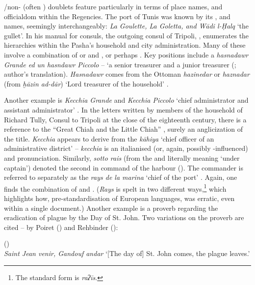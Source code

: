 \documentclass[output=paper]{langsci/langscibook}
\begin{document}
	/non- (often ) doublets feature particularly in terms of place names, and officialdom within the Regencies. The port of Tunis was known by its ,  and  names, seemingly interchangeably: \textit{La Goulette, La Goletta, and Wādi l-Ḥalq} ‘the gullet’. In his manual for  consuls, the outgoing  consul of Tripoli, , enumerates the hierarchies within the Pasha’s household and city administration. Many of these involve a combination of  or  and , or perhaps . Key positions include a \textit{hasnadawr Grande ed un hasndawr Piccolo} – ‘a senior treasurer and a junior treasurer (\citealt[97]{Pennell1982}; author's translation).  \textit{Hasnadawr} comes from the Ottoman  \textit{hazinedar} or \textit{haznadar} (from  \textit{ḫāzin ad-dār}) ‘Lord treasurer of the household’ \citep{Gilson1987}.
	
	Another example is \textit{Kecchia Grande} and \textit{Kecchia Piccolo} ‘chief administrator and assistant administrator’ \citep[104]{Pennell1982}. In the letters written by members of the household of Richard Tully,  Consul to Tripoli at the close of the eighteenth century, there is a reference to the ``Great Chiah and the Little Chiah'' \citep[70]{Tully1819}, surely an anglicization of the title. \textit{Kecchia} appears to derive from the   \textit{kāhiya} ‘chief officer of an administrative district’ – \textit{kecchia} is an italianised (or, again, possibly -influenced)  and pronunciation. Similarly, \textit{sotto rais} (from the  and  literally meaning ‘under captain’) denoted the second in command of the harbour (\citealt[97, 100]{Pennell1982}). The commander is referred to separately as the \textit{rays de la marina} ‘chief of the port’ \citep[92]{Pennell1982}. Again, one finds the combination of  and . (\textit{Rays} is spelt in two different ways,\footnote{The standard  form is \textit{raʔīs}.} which highlights how, pre-standardisation of European languages,  was erratic, even within a single document.) Another example is a proverb regarding the eradication of plague by the Day of St. John. Two variations on the proverb are cited – by Poiret (\citeyear{Poiret1802}) and Rehbinder (\citeyear{Rehbinder1800}): 
	
	\ea
	(\citealt{Poiret1802})\\
	\textit{Saint Jean venir, Gandouf andar} 
	\glt ‘[The day of] St. John comes, the plague leaves.’
	\z
	
\end{document}
